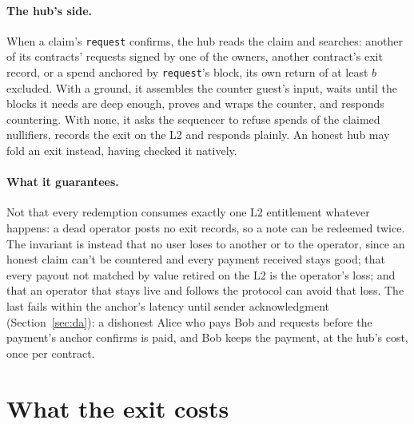 \documentclass[11pt]{article}
\newcommand{\tx}[1]{\texttt{#1}}
\begin{document}
\paragraph{The hub's side.} When a claim's \tx{request} confirms, the
hub reads the claim and searches: another of its contracts' requests
signed by one of the owners, another contract's exit record, or a spend
anchored by \tx{request}'s block, its own return of at least $b$
excluded. With a ground, it assembles the counter guest's input, waits
until the blocks it needs are deep enough, proves and wraps the counter,
and responds countering. With none, it asks the sequencer to refuse
spends of the claimed nullifiers, records the exit on the L2 and
responds plainly. An honest hub may fold an exit instead, having
checked it natively.

\paragraph{What it guarantees.} Not that every redemption consumes
exactly one L2 entitlement whatever happens: a dead operator posts no
exit records, so a note can be redeemed twice. The invariant is instead
that no user loses to another or to the operator, since an honest claim
can't be countered and every payment received stays good; that every
payout not matched by value retired on the L2 is the operator's loss;
and that an operator that stays live and follows the protocol can avoid
that loss. The last fails within the anchor's latency until sender
acknowledgment (Section~\ref{sec:da}): a dishonest Alice who pays Bob
and requests before the payment's anchor confirms is paid, and Bob keeps
the payment, at the hub's cost, once per contract.

\section{What the exit costs}
\label{sec:costs}
\end{document}
